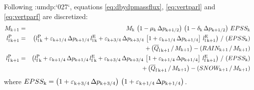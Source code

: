 \documentclass{UMDP_article}
\newcommand{\citeumdp}[1]{:umdp:`#1`}
\newcommand{\lsubsup}[2]{\ensuremath{l_{\rm{#1}}^{\rm{#2}}}}
\newcommand{\lc}{\left[}
\newcommand{\rc}{\right]}
\newcommand{\ov}{\overline}
\newcommand{\lp}{\left(}
\newcommand{\rp}{\right)}
\begin{document}
Following \citeumdp{027}, equations \ref{eq:dbydpmassflux}, \ref{eq:vertparl} and
\ref{eq:vertparf} are discretized:
% 
\begin{eqnarray}
M_{\rm{k} + 1} & = & M_{\rm{k}} \, 
\lp { 1 - \mu_{\rm{k}} \, \Delta p_{\rm{k} + 1 / 2} } \rp \,
\lp { 1 - \delta_{\rm{k}} \, \Delta p_{\rm{k} + 1 / 2} } \rp \,
EPSS_{\rm{k}}  \label{eq:discdmfbydp} \\
\lsubsup{l \, k + 1}{P} & = & \lp { 
\lsubsup{l \, k}{P} +  
\varepsilon_{\rm{k} + 1/4} \, \Delta p_{\rm{k} + 1/4} \, \lsubsup{l \, k}{E} +
\varepsilon_{\rm{k} + 3/4} \, \Delta p_{\rm{k} + 3/4} \, 
\lc {1 + \varepsilon_{\rm{k} + 1 / 4} \, \Delta p_{\rm{k} + 1 / 4}} \rc \,
\lsubsup{l \, k + 1}{E}
} \rp \, / \, \lp {EPSS_{\rm{k}}} \rp  \nonumber \\
{ } & { } & + \lp { {\ov{Q}}_{\rm{l} \, \rm{k} + 1} \, / \, M_{\rm{k} + 1}} \rp 
- \lp { RAIN_{\rm{k} + 1} \, / \, M_{\rm{k} + 1} } \rp
\label{eq:discvparl} \\
\lsubsup{f \, k + 1}{P} & = & \lp { 
\lsubsup{f \, k}{P} + 
\varepsilon_{\rm{k} + 1/4} \, \Delta p_{\rm{k} + 1/4} \, \lsubsup{f \, k}{E} +
\varepsilon_{\rm{k} + 3/4} \, \Delta p_{\rm{k} + 3/4} \, 
\lc {1 + \varepsilon_{\rm{k} + 1 / 4} \, \Delta p_{\rm{k} + 1 / 4}} \rc \,
\lsubsup{f \, k + 1}{E}
} \rp \, / \, \lp {EPSS_{\rm{k}}} \rp  \nonumber \\
{ } & { } & + \lp { {\ov{Q}}_{\rm{f} \, \rm{k} + 1} \, / \, M_{\rm{k} + 1}} \rp 
- \lp { SNOW_{\rm{k} + 1} \, / \, M_{\rm{k} + 1} } \rp
\label{eq:discvparf}
\end{eqnarray}
%
where $EPSS_{\rm{k}} = 
\lp {1 + \varepsilon_{\rm{k} + 3 / 4} \, \Delta p_{\rm{k} + 3 / 4}} \rp \, 
\lp {1 + \varepsilon_{\rm{k} + 1 / 4} \, \Delta p_{\rm{k} + 1 / 4}} \rp $.
\end{document}
